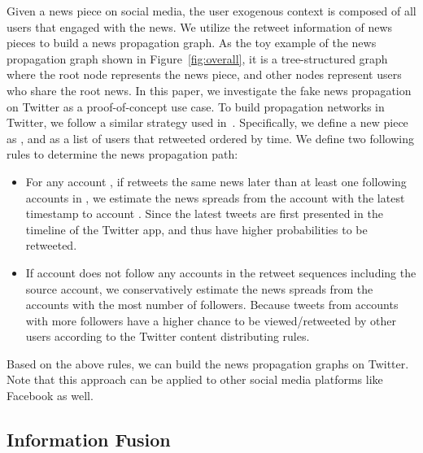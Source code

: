 \documentclass[sigconf]{acmart}
\begin{document}
Given a news piece on social media, the user exogenous context is composed of all users that engaged with the news. We utilize the retweet information of news pieces to build a news propagation graph.
As the toy example of the news propagation graph shown in Figure~\ref{fig:overall}, it is a tree-structured graph where the root node represents the news piece, and other nodes represent users who share the root news.
In this paper, we investigate the fake news propagation on Twitter as a proof-of-concept use case.
To build propagation networks in Twitter, we follow a similar strategy used in~\cite{shu2020hierarchical, monti2019fake, han2020graph}.
Specifically, we define a new piece as , and  as a list of users that retweeted  ordered by time. We define two following rules to determine the news propagation path:

\begin{itemize}[leftmargin=*]
    \item For any account , if  retweets the same news later than at least one following accounts in , we estimate the news spreads from the account with the latest timestamp to account .
    Since the latest tweets are first presented in the timeline of the Twitter app, and thus have higher probabilities to be retweeted.
    
    \item If account  does not follow any accounts in the retweet sequences including the source account, we conservatively estimate the news spreads from the accounts with the most number of followers.
    Because tweets from accounts with more followers have a higher chance to be viewed/retweeted by other users according to the Twitter content distributing rules. 
\end{itemize}
Based on the above rules, we can build the news propagation graphs on Twitter.
Note that this approach can be applied to other social media platforms like Facebook as well.


\subsection{Information Fusion}
\label{sec03:fusion}
\end{document}
